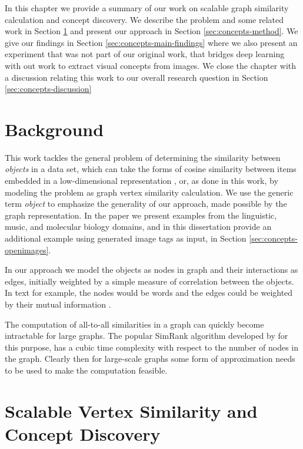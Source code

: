 In this chapter we provide a summary of our work on scalable graph similarity calculation
and concept discovery.
We describe the problem and some related work in Section \ref{sec:concepts-background}
and present our approach in Section \ref{sec:concepts-method}. We give our
findings in Section \ref{sec:concepts-main-findings} where we also present an experiment that was not part of our original work, that
bridges deep learning with out work to extract visual concepts from images.
We close the chapter with a discussion relating this work to our overall
research question in Section \ref{sec:concepts-discussion}

\section{Background}

\label{sec:concepts-background}

This work tackles the general problem of determining the similarity between \emph{objects}
in a data set, which can take the forms of cosine similarity between
items embedded in a low-dimensional representation \cite{word2vec}, or, as done
in this work, by modeling the problem as graph vertex similarity calculation.
We use the generic term \emph{object} to emphasize the generality of our
approach, made possible by the graph representation. In the paper we present examples from the linguistic,
music, and molecular biology domains, and in this dissertation provide an additional example using
generated image tags as input, in Section \ref{sec:concepts-openimages}.

In our approach we model the objects as nodes in graph and their interactions as edges,
initially weighted by a simple measure of correlation between the objects. In text for example, the
nodes would be words and the edges could be weighted by their mutual information \cite{mutual-information-nlp}.

The computation of all-to-all similarities in a graph can quickly become
intractable for large graphs. The popular SimRank algorithm developed by
\citet{simrank} for this purpose,
has a cubic time complexity with respect to the number of nodes in the graph.
Clearly then for large-scale graphs some form of approximation needs to be used
to make the computation feasible.


\section{Scalable Vertex Similarity and Concept Discovery}

